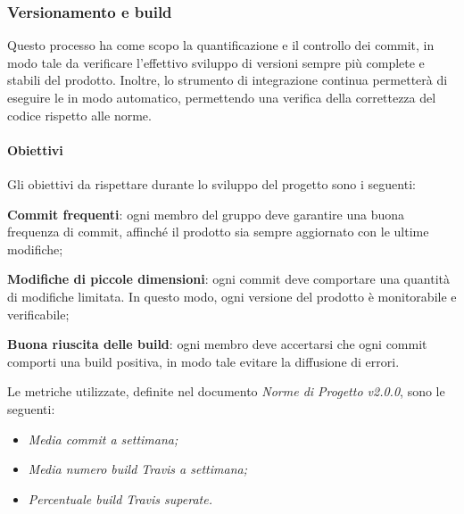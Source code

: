 \subsubsection{Versionamento e build} 
Questo processo ha come scopo la quantificazione e il controllo dei commit, in modo tale da verificare l'effettivo sviluppo di versioni sempre più complete e stabili del prodotto. Inoltre, lo strumento di integrazione continua  permetterà di eseguire le  in modo automatico, permettendo una verifica della correttezza del codice rispetto alle norme.
\paragraph{Obiettivi} \Spazio
Gli obiettivi da rispettare durante lo sviluppo del progetto sono i seguenti:
\begin{itemize}
	\item{\textbf{Commit frequenti}: ogni membro del gruppo deve garantire una buona frequenza di commit, affinché il prodotto sia sempre aggiornato con le ultime modifiche;
	\item{\textbf{Modifiche di piccole dimensioni}: ogni commit deve comportare una quantità di modifiche limitata. In questo modo, ogni versione del prodotto è monitorabile e verificabile;}
	\item{\textbf{Buona riuscita delle build}: ogni membro deve accertarsi che ogni commit comporti una build positiva, in modo tale evitare la diffusione di errori.}
	}
\end{itemize}
Le metriche utilizzate, definite nel documento \emph{Norme di Progetto v2.0.0}, sono le seguenti:
\begin{itemize}
	\item\emph{Media commit a settimana;}
	\item\emph{Media numero build Travis a settimana;}
	\item\emph{Percentuale build Travis superate.}
\end{itemize}

